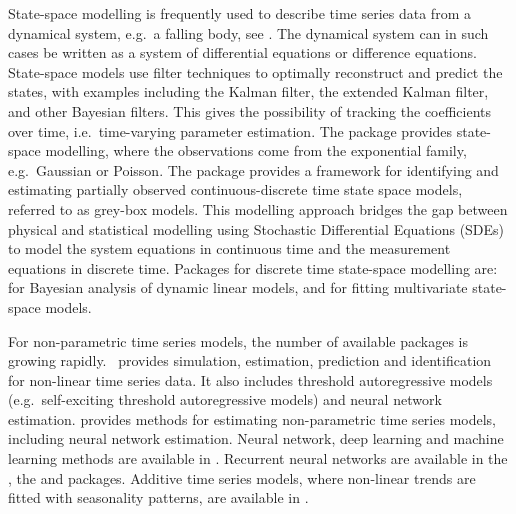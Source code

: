 State-space modelling is frequently used to describe time series data from a
dynamical system, e.g.\ a falling body, see \citep{madsen2007time}. The
dynamical system can in such cases be written as a system of differential
equations or difference equations. State-space models use filter techniques to optimally
reconstruct and predict the states, with examples including the Kalman filter, the extended Kalman
filter, and other Bayesian filters. This gives the possibility of tracking the
coefficients over time, i.e.\ time-varying parameter estimation. The
 package
\citep{kfas2017} provides state-space modelling, where the observations come
from the exponential family, e.g.\ Gaussian or Poisson. The
 package provides a framework for
identifying and estimating partially observed continuous-discrete time state
space models, referred to as grey-box models. This modelling approach bridges
the gap between physical and statistical modelling using Stochastic Differential
Equations (SDEs) to model the system equations in continuous time and the
measurement equations in discrete time. Packages for discrete time state-space
modelling are:
 for
Bayesian analysis of dynamic linear models,
 and
for fitting multivariate state-space models. 

For non-parametric time series models, the number of available packages is
growing rapidly.\ 
provides simulation, estimation, prediction and identification for non-linear
time series data. It also includes threshold autoregressive models
(e.g.\ self-exciting threshold autoregressive models) and neural network
estimation.  provides
methods for estimating non-parametric time series models, including neural
network estimation. Neural network, deep learning and machine learning methods
are available in \Rprog{}. Recurrent neural networks are
available in
the , the
 and
 packages. Additive
time series models, where non-linear trends are fitted with seasonality
patterns, are available in
. 

